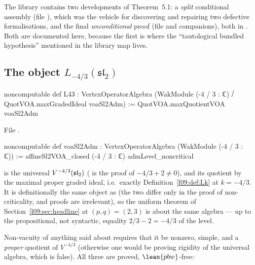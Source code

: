 The library contains two developments of Theorem~5.1: a \emph{split} conditional assembly
(file ), which was the vehicle for discovering and
repairing two defective formalisations, and the final \emph{unconditional} proof
(file  and companions), both in . Both are documented here,
because the first is where the ``tautological bundled hypothesis'' mentioned in the library map
lives.

\subsection{The object \texorpdfstring{$L_{-4/3}(\mathfrak{sl}_2)$}{L(-4/3)}}

\begin{leancode}
noncomputable def L43 :
    VertexOperatorAlgebra (WakModule (-4 / 3 : ℂ) ⧸ QuotVOA.maxGradedIdeal voaSl2Adm) :=
  QuotVOA.maxQuotientVOA voaSl2Adm
\end{leancode}
\noindent File .
\begin{leancode}
noncomputable def voaSl2Adm : VertexOperatorAlgebra (WakModule (-4 / 3 : ℂ)) :=
  affineSl2VOA_closed (-4 / 3 : ℂ) admLevel_noncritical
\end{leancode}

\begin{dictionary}
 is the universal $V^{-4/3}(\mathfrak{sl}_2)$ ( is the proof of
$-4/3+2\neq0$), and  its quotient by the maximal proper graded ideal, i.e.\ exactly
Definition~\ref{l09:def:Lk} at $k=-4/3$. It is definitionally the same object as
 (the two differ only in the proof of
non-criticality, and proofs are irrelevant), so the uniform theorem of Section~\ref{l09:sec:headline}
at $(p,q) = (2,3)$ is about the same algebra --- up to the propositional, not syntactic, equality
$2/3 - 2 = -4/3$ of the level.
\end{dictionary}

Non-vacuity of anything said about  requires that it be nonzero, simple, and a
\emph{proper} quotient of $V^{-4/3}$ (otherwise one would be proving rigidity of the universal
algebra, which is false). All three are proved, $\lean{pbw}$-free:

